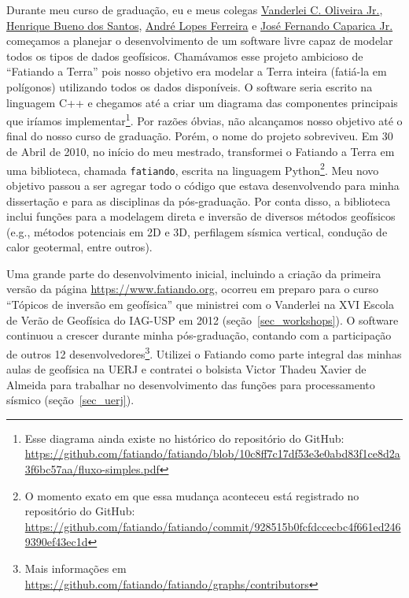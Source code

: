 \documentclass[12pt,a4paper,oneside]{book}
\begin{document}
Durante meu curso de graduação, eu e meus colegas
\href{https://www.pinga-lab.org/people/oliveira-jr.html}{Vanderlei C. Oliveira Jr.},
\href{https://www.linkedin.com/in/hbuenos/}{Henrique Bueno dos Santos},
\href{https://www.linkedin.com/in/andr%C3%A9-ferreira-lopes/}{André Lopes Ferreira} e
\href{https://www.linkedin.com/in/josecaparica/}{José Fernando Caparica Jr.}
começamos a planejar o desenvolvimento de um software livre capaz de modelar
todos os tipos de dados geofísicos.
Chamávamos esse projeto ambicioso de ``Fatiando a Terra'' pois nosso objetivo
era modelar a Terra inteira (fatiá-la em polígonos) utilizando todos os dados
disponíveis.
O software seria escrito na linguagem C++ e chegamos até a criar um diagrama
das componentes principais que iríamos implementar\footnote{Esse diagrama ainda
existe no histórico do repositório do GitHub: \url{https://github.com/fatiando/fatiando/blob/10c8ff7c17df53e3e0abd83f1ce8d2a3f6bc57aa/fluxo-simples.pdf}}.
Por razões óbvias, não alcançamos nosso objetivo até o final do nosso curso de
graduação.
Porém, o nome do projeto sobreviveu.
Em 30 de Abril de 2010, no início do
meu mestrado, transformei o Fatiando a Terra em uma biblioteca, chamada
\texttt{fatiando}, escrita na linguagem Python\footnote{O momento exato em que
essa mudança aconteceu está registrado no repositório do GitHub:
\url{https://github.com/fatiando/fatiando/commit/928515b0fcfdccecbc4f661ed2469390ef43ec1d}}.
Meu novo objetivo passou a ser agregar todo o código que estava desenvolvendo
para minha dissertação e para as disciplinas da pós-graduação.
Por conta disso, a biblioteca inclui funções para a modelagem direta e inversão
de diversos métodos geofísicos (e.g., métodos potenciais em 2D e 3D, perfilagem
sísmica vertical, condução de calor geotermal, entre outros).

Uma grande parte do desenvolvimento inicial, incluindo a criação da primeira
versão da página \url{https://www.fatiando.org}, ocorreu em preparo para o
curso ``Tópicos de inversão em geofísica'' que ministrei com o Vanderlei na XVI
Escola de Verão de Geofísica do IAG-USP em 2012 (seção~\ref{sec_workshops}).
O software continuou a crescer durante minha pós-graduação, contando com a
participação de outros 12 desenvolvedores\footnote{Mais informações em
\url{https://github.com/fatiando/fatiando/graphs/contributors}}.
Utilizei o Fatiando como parte integral das minhas aulas de geofísica na
UERJ e contratei o bolsista Victor Thadeu Xavier de Almeida para trabalhar no
desenvolvimento das funções para processamento sísmico (seção~\ref{sec_uerj}).
\end{document}

